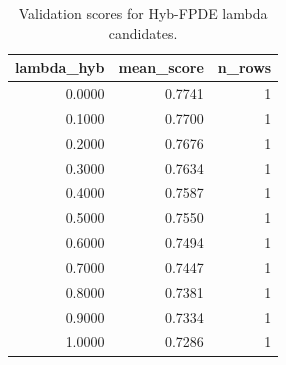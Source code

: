 \begin{table}[t]
\caption{Validation scores for Hyb-FPDE lambda candidates.}
\label{tab:lambda_distribution_computed}
\centering
\begin{tabular}{rrr}
\toprule
lambda\_hyb & mean\_score & n\_rows \\
\midrule
0.0000 & 0.7741 & 1 \\
0.1000 & 0.7700 & 1 \\
0.2000 & 0.7676 & 1 \\
0.3000 & 0.7634 & 1 \\
0.4000 & 0.7587 & 1 \\
0.5000 & 0.7550 & 1 \\
0.6000 & 0.7494 & 1 \\
0.7000 & 0.7447 & 1 \\
0.8000 & 0.7381 & 1 \\
0.9000 & 0.7334 & 1 \\
1.0000 & 0.7286 & 1 \\
\bottomrule
\end{tabular}

\end{table}
